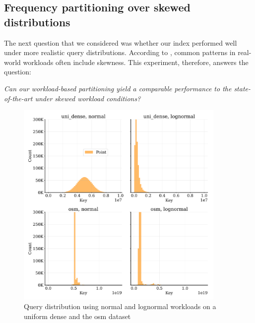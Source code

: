 \subsection{Frequency partitioning over skewed distributions}
The next question that we considered was whether our index performed well under more realistic query distributions. According to \citeauthor{Anneser2022} \cite{Anneser2022}, common patterns in real-world workloads often include skewness. This experiment, therefore, answers the question:

\begin{center}
    \textit{Can our workload-based partitioning yield a comparable performance to the state-of-the-art under skewed workload conditions?}
\end{center}


\begin{figure}[!ht]
    \centering
    \includegraphics[width=0.9\textwidth]{figures/exp2_query_dist.pdf}
    \caption[uni and osm query distributions after normal and lognormal sampling]{Query distribution using normal and lognormal workloads on a uniform dense and the osm dataset}
    \label{fig:skeweddist}
\end{figure}

